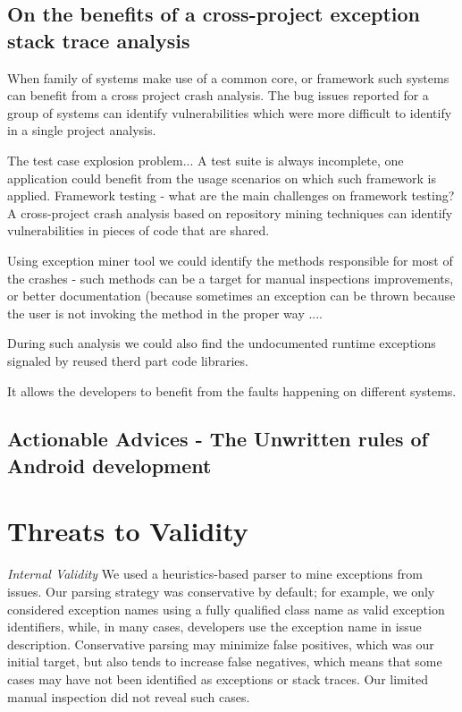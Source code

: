 \documentclass[conference]{IEEEtran}
\begin{document}
\subsection{On the benefits of a cross-project exception stack trace analysis}  

When family of systems make use of a common core, or framework such systems can
benefit from a cross project crash analysis. The bug issues reported for a group of systems
can identify vulnerabilities which were more difficult to identify in a single project analysis.

The test case explosion problem... A test suite is always incomplete,
one application could benefit from the usage scenarios on which such framework is applied.
Framework testing -  what are the main challenges on framework testing?
A cross-project crash analysis based on repository mining techniques can 
identify vulnerabilities in pieces of code that are shared. 

Using exception miner tool we could identify the methods responsible for most of the crashes - 
such methods can be a target for manual inspections improvements, or better documentation
(because sometimes an exception can be thrown because the user is not invoking the method
in the proper way ....

During such analysis we could also find the undocumented runtime exceptions 
signaled by reused therd part code libraries. 

It allows the developers to benefit from the faults happening on different systems.


\subsection{Actionable Advices - The Unwritten rules of Android development}


\section{Threats to Validity}

\noindent\emph{Internal Validity} We used a heuristics-based parser to mine
exceptions from issues.  Our parsing strategy was conservative by default; for
example, we only considered exception names using a fully qualified class name
as valid exception identifiers, while, in many cases, developers use the
exception name in issue description. Conservative parsing may minimize false
positives, which was our initial target, but also tends to increase false
negatives, which means that some cases may have not been identified as
exceptions or stack traces. Our limited manual inspection did not reveal such
cases.
\end{document}
